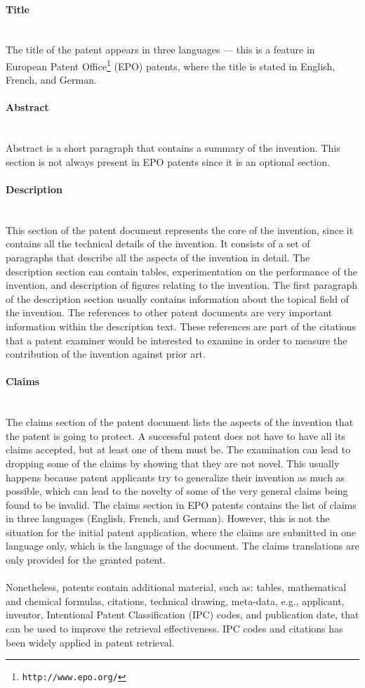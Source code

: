 \paragraph{Title}
\ \\ 
The title of the patent appears in three languages --- this is a feature in European Patent Office\footnote{\texttt{http://www.epo.org/}} (EPO)
patents, where the title is stated in English, French, and German. 
\paragraph{Abstract}
\ \\ 
Abstract is a short paragraph that contains
a summary of the invention. This section is not always present in EPO patents since it is an
optional section.
\paragraph{Description}
\ \\ 
This section of the patent document represents the core of the invention, since it contains all the
technical details of the invention. It consists of a set of paragraphs that describe all the aspects of
the invention in detail. The description
section can contain tables, experimentation on the performance of the invention, and description 
of figures relating to the invention. The first paragraph of the description section usually contains
information about the topical field of the invention. The references to other patent
documents are very important information within the description text. 
These references are part of the citations that a patent
examiner would be interested to examine in order to measure the contribution of the invention
against prior art. 
\paragraph{Claims}
\ \\ 
The claims section of the patent document lists the aspects of the invention that the patent is
going to protect. A successful patent does not have to have all its claims accepted, but at least one
of them must be. The examination can lead to dropping some of the claims by showing that they
are not novel. This usually happens because patent applicants try to generalize their invention as
much as possible, which can lead to the novelty of some of the very general claims being found to
be invalid.
The claims section in EPO patents contains the list of claims in three languages (English,
French, and German). However, this is not the situation for the initial patent application, where
the claims are submitted in one language only, which is the language of the document. The
claims translations are only provided for the granted patent.\\\\
Nonetheless, patents contain
additional material, such as: tables, mathematical and chemical formulas, citations,
technical drawing, meta-data, e.g., applicant, inventor, Intentional Patent Classification 
(IPC) codes, and publication date, that can be used to improve the retrieval effectiveness.
IPC codes and citations has been widely applied in patent retrieval. 
